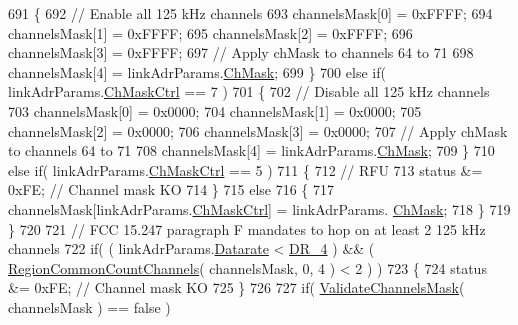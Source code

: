 \begin{DoxyCode}
691         \{
692             \textcolor{comment}{// Enable all 125 kHz channels}
693             channelsMask[0] = 0xFFFF;
694             channelsMask[1] = 0xFFFF;
695             channelsMask[2] = 0xFFFF;
696             channelsMask[3] = 0xFFFF;
697             \textcolor{comment}{// Apply chMask to channels 64 to 71}
698             channelsMask[4] = linkAdrParams.\mbox{\hyperlink{structs_region_common_link_adr_params_adb3d38c312a46e617b1319f97dd56a87}{ChMask}};
699         \}
700         \textcolor{keywordflow}{else} \textcolor{keywordflow}{if}( linkAdrParams.\mbox{\hyperlink{structs_region_common_link_adr_params_ac5e1891f30a172b2ce39bc3498e1843d}{ChMaskCtrl}} == 7 )
701         \{
702             \textcolor{comment}{// Disable all 125 kHz channels}
703             channelsMask[0] = 0x0000;
704             channelsMask[1] = 0x0000;
705             channelsMask[2] = 0x0000;
706             channelsMask[3] = 0x0000;
707             \textcolor{comment}{// Apply chMask to channels 64 to 71}
708             channelsMask[4] = linkAdrParams.\mbox{\hyperlink{structs_region_common_link_adr_params_adb3d38c312a46e617b1319f97dd56a87}{ChMask}};
709         \}
710         \textcolor{keywordflow}{else} \textcolor{keywordflow}{if}( linkAdrParams.\mbox{\hyperlink{structs_region_common_link_adr_params_ac5e1891f30a172b2ce39bc3498e1843d}{ChMaskCtrl}} == 5 )
711         \{
712             \textcolor{comment}{// RFU}
713             status &= 0xFE; \textcolor{comment}{// Channel mask KO}
714         \}
715         \textcolor{keywordflow}{else}
716         \{
717             channelsMask[linkAdrParams.\mbox{\hyperlink{structs_region_common_link_adr_params_ac5e1891f30a172b2ce39bc3498e1843d}{ChMaskCtrl}}] = linkAdrParams.
      \mbox{\hyperlink{structs_region_common_link_adr_params_adb3d38c312a46e617b1319f97dd56a87}{ChMask}};
718         \}
719     \}
720 
721     \textcolor{comment}{// FCC 15.247 paragraph F mandates to hop on at least 2 125 kHz channels}
722     \textcolor{keywordflow}{if}( ( linkAdrParams.\mbox{\hyperlink{structs_region_common_link_adr_params_ae2f6080f3aa0e9485c55513ca56bb24d}{Datarate}} < \mbox{\hyperlink{group___r_e_g_i_o_n_ga6ceba6158a7dab238e9d0b846fb47a0c}{DR\_4}} ) && ( 
      \mbox{\hyperlink{group___r_e_g_i_o_n_c_o_m_m_o_n_gac23f0831812f610f57f42f6cf87368c9}{RegionCommonCountChannels}}( channelsMask, 0, 4 ) < 2 ) )
723     \{
724         status &= 0xFE; \textcolor{comment}{// Channel mask KO}
725     \}
726 
727     \textcolor{keywordflow}{if}( \mbox{\hyperlink{_region_u_s915-_hybrid_8c_a15a15fb81475f8a2ff4c6c5a60aa291d}{ValidateChannelsMask}}( channelsMask ) == \textcolor{keyword}{false} )

\end{DoxyCode}
